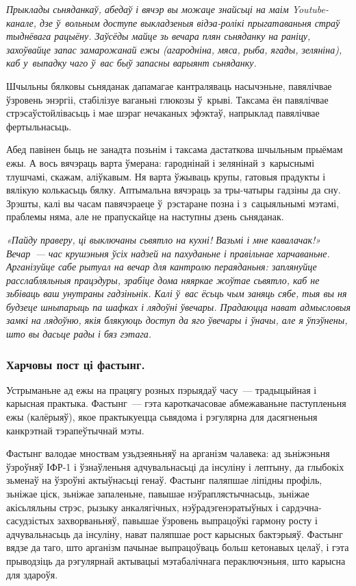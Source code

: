 \emph{Прыклады сьняданкаў, абедаў і вячэр вы можаце знайсьці на маім Youtube-канале, дзе ў~вольным доступе выкладзеныя відэа-ролікі прыгатаваньня страў тыднёвага рацыёну. Заўсёды майце зь вечара плян сьняданку на раніцу, захоўвайце запас замарожанай ежы (агародніна, мяса, рыба, ягады, зеляніна), каб у~выпадку чаго ў~вас быў запасны варыянт сьняданку.}

Шчыльны бялковы сьняданак дапамагае кантраляваць насычэньне, павялічвае ўзровень энэргіі, стабілізуе ваганьні глюкозы ў~крыві. Таксама ён павялічвае стрэсаўстойлівасьць і мае шэраг нечаканых эфэктаў, напрыклад павялічвае фертыльнасьць. 


Абед павінен быць не занадта позьнім і таксама дастаткова шчыльным прыёмам ежы. А вось вячэраць варта ўмерана: гароднінай і зелянінай з~карыснымі тлушчамі, скажам, аліўкавым. Ня варта ўжываць крупы, гатовыя прадукты і вялікую колькасьць бялку. Аптымальна вячэраць за тры-чатыры гадзіны да сну. Зрэшты, калі вы часам павячэраеце ў~рэстаране позна і з~сацыяльнымі мэтамі, праблемы няма, але не прапускайце на наступны дзень сьняданак. 

\emph{«Пайду праверу, ці выключаны сьвятло на кухні! Вазьмі і мне кавалачак!» Вечар~--- час крушэньня ўсіх надзей на пахуданьне і правільнае харчаваньне. Арганізуйце сабе рытуал на вечар для кантролю пераяданьня: заплянуйце расслабляльныя працэдуры, зрабіце дома няяркае жоўтае сьвятло, каб не зьбіваць ваш унутраны гадзіньнік. Калі ў~вас ёсьць чым заняць сябе, тыя вы ня будзеце шныпарыць па шафках і лядоўні ўвечары. Прадаюцца нават адмысловыя замкі на лядоўню, якія блякуюць доступ да яго ўвечары і ўначы, але я ўпэўнены, што вы дасьце рады і бяз гэтага.}

\subsubsection{Харчовы пост ці фастынг.}
Устрыманьне ад ежы на працягу розных пэрыядаў часу~--- традыцыйная і карысная практыка. Фастынг~--- гэта кароткачасовае абмежаваньне паступленьня ежы (калёрыяў), якое практыкуецца сьвядома і рэгулярна для дасягненьня канкрэтнай тэрапеўтычнай мэты.

Фастынг валодае мноствам узьдзеяньняў на арганізм чалавека: ад зьніжэньня ўзроўняў ІФР-1 і ўзнаўленьня адчувальнасьці да інсуліну і лептыну, да глыбокіх зьменаў на ўзроўні актыўнасьці генаў. Фастынг паляпшае ліпідны профіль, зьніжае ціск, зьніжае запаленьне, павышае нэўраплястычнасьць, зьніжае акісьляльны стрэс, рызыку анкалягічных, нэўрадэгенэратыўных і сардэчна-сасудзістых захворваньняў, павышае ўзровень выпрацоўкі гармону росту і адчувальнасьць да інсуліну, нават паляпшае рост карысных бактэрыяў. Фастынг вядзе да таго, што арганізм пачынае выпрацоўваць больш кетонавых целаў, і гэта прыводзіць да рэгулярнай актывацыі мэтабалічнага пераключэньня, што карысна для здароўя.


